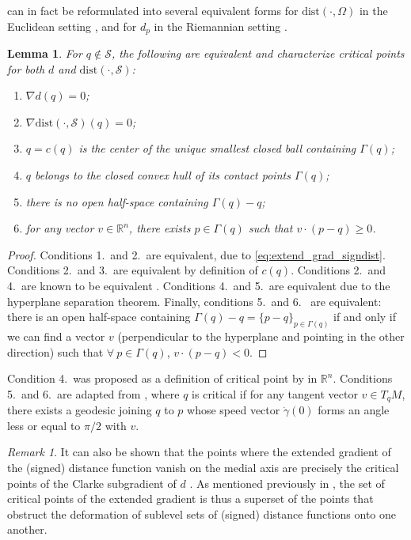 \documentclass[11pt]{article}
\newcommand{\R}{\mathbb{R}}
\newcommand{\W}{\Omega}
\newcommand{\dist}{\mathrm{dist}}
\newcommand{\Surf}{\mathcal{S}}
\newcommand{\grad}{\nabla}
\theoremstyle{plain}
\newtheorem{lem}{Lemma}
\theoremstyle{definition}
\theoremstyle{remark}
\newtheorem{rmk}{Remark}
\begin{document}
 can in fact be reformulated into several equivalent forms for $\dist(\cdot, \W)$ in the Euclidean setting \citep{lieutier_any_2003,chazal_stability_2007}, and for $d_p$ in the Riemannian setting \citep{grove_generalized_1977, cheeger_critical_1991}.

\begin{lem}
\label{lem:equivalent_definitions_critical_point}
	For $q \notin \Surf$, the following are equivalent and characterize critical points for both $d$ and $\dist(\cdot, \Surf)$:
	\begin{enumerate}
        \item $\grad d(q) = 0$;
        \item $\grad \dist(\cdot, \Surf)(q) = 0$;
		\item $q = c(q)$ is the center of the unique smallest closed ball
		containing $\Gamma(q)$;
		\item $q$ belongs to the closed convex hull of its contact points $\Gamma(q)$;
		\item there is no open half-space containing $\Gamma(q)-q$;
		\item for any vector $v \in \R^n$, there exists $p \in \Gamma(q)$ such that 
        $v \cdot (p-q) \geq 0$.
	\end{enumerate}
\end{lem}
\begin{proof}
Conditions 1.~and 2.~are equivalent, due to \cref{eq:extend_grad_signdist}. Conditions 2.~and 3.~are equivalent by definition of $c(q)$.
Conditions 2.~and 4.~are known to be equivalent \cite[Lemma 2.2]{chazal_stability_2007}. 
Conditions 4.~and 5.~are equivalent due to the hyperplane separation theorem.
Finally, conditions 5.~and 6.~ are equivalent: 
there is an open half-space containing $\Gamma(q) - q = \{p - q\}_{p \in \Gamma(q)}$ if and only if we can find a vector $v$ (perpendicular to the hyperplane and pointing in the other direction) such that $\forall\ p \in \Gamma(q)$, $v \cdot (p-q) < 0$.
\end{proof}
Condition 4.~was proposed as a definition of critical point by \cite{ferry_when_1976} in $\R^n$.
Conditions 5.~and 6.~are adapted from \cite{grove_generalized_1977,cheeger_critical_1991}, where $q$ is critical if for any tangent vector $v \in T_q M$, there exists a geodesic joining $q$ to $p$ whose speed vector $\dot\gamma(0)$ forms an angle less or equal to $\pi / 2$ with $v$.

\begin{rmk}
    It can also be shown that the points where the extended gradient of the (signed) distance function vanish on the medial axis are precisely the critical points of the Clarke subgradient of $d$ \citep{clarke1990optimization}. As mentioned previously in , the set of critical points of the extended gradient is thus a superset of the points that obstruct the deformation of sublevel sets of (signed) distance functions onto one another. 
\end{rmk}
 
\end{document}
